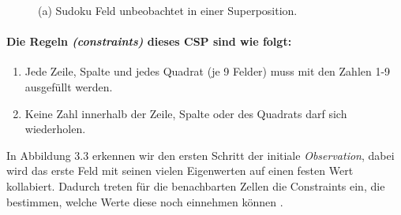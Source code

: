 \documentclass[12pt, a4paper,twoside,openany]{report} %
\begin{document}
\begin{figure}[H]
    \centering
    \caption{(a) Sudoku Feld unbeobachtet in einer Superposition.}%
\end{figure}

\paragraph{Die Regeln \textit{(constraints)} dieses CSP sind wie folgt:}
\begin{enumerate}
    \item Jede Zeile, Spalte und jedes Quadrat {(je 9 Felder)} muss mit den Zahlen 1-9 ausgefüllt werden.
    \item Keine Zahl innerhalb der Zeile, Spalte oder des Quadrats darf sich wiederholen.
\end{enumerate}

In Abbildung 3.3 erkennen wir den ersten Schritt der initiale \textit{Observation}, dabei wird das erste Feld mit seinen vielen Eigenwerten auf einen festen Wert kollabiert.
Dadurch treten für die benachbarten Zellen die Constraints ein, die bestimmen, welche Werte diese noch einnehmen können \cite{boris}.
\end{document}
